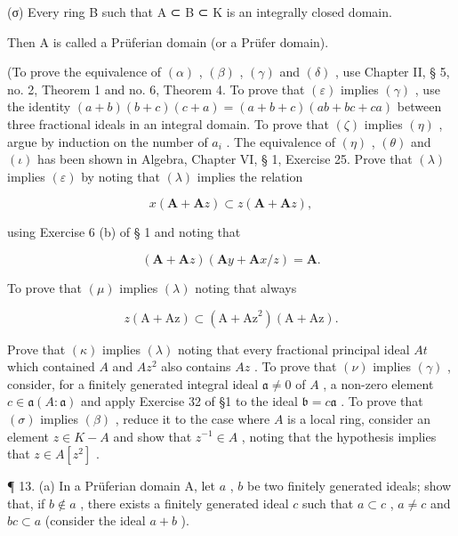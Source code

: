 (σ) Every ring B such that A ⊂ B ⊂ K is an integrally closed domain.

Then A is called a Prüferian domain (or a Prüfer domain).

(To prove the equivalence of \((\alpha)\) , \((\beta)\) , \((\gamma)\) and \((\delta)\) , use Chapter II, § 5, no. 2, Theorem 1 and no. 6, Theorem 4. To prove that \((\varepsilon)\) implies \((\gamma)\) , use the identity \((a + b)(b + c)(c + a) = (a + b + c)(ab + bc + ca)\) between three fractional ideals in an integral domain. To prove that \((\zeta)\) implies \((\eta)\) , argue by induction on the number of \(a_i\) . The equivalence of \((\eta)\) , \((\theta)\) and \((\iota)\) has been shown in Algebra, Chapter VI, § 1, Exercise 25. Prove that \((\lambda)\) implies \((\varepsilon)\) by noting that \((\lambda)\) implies the relation

\[
x (\mathbf {A} + \mathbf {A} z) \subset z (\mathbf {A} + \mathbf {A} z),
\]

using Exercise 6 (b) of § 1 and noting that

\[
(\mathbf {A} + \mathbf {A} z) (\mathbf {A} y + \mathbf {A} x / z) = \mathbf {A}.
\]

To prove that \((\mu)\) implies \((\lambda)\) noting that always

\[
z (\mathrm{A} + \mathrm{Az}) \subset (\mathrm{A} + \mathrm{Az} ^ {2}) (\mathrm{A} + \mathrm{Az}).
\]

Prove that \((\kappa)\) implies \((\lambda)\) noting that every fractional principal ideal \(A t\) which contained \(A\) and \(A z^2\) also contains \(A z\) . To prove that \((\nu)\) implies \((\gamma)\) , consider, for a finitely generated integral ideal \(\mathfrak{a} \neq 0\) of \(A\) , a non-zero element \(c \in \mathfrak{a}(A: \mathfrak{a})\) and apply Exercise 32 of §1 to the ideal \(\mathfrak{b} = c \mathfrak{a}\) . To prove that \((\sigma)\) implies \((\beta)\) , reduce it to the case where \(A\) is a local ring, consider an element \(z \in K - A\) and show that \(z^{-1} \in A\) , noting that the hypothesis implies that \(z \in A[z^2]\) .

¶ 13. (a) In a Prüferian domain A, let \(a\) , \(b\) be two finitely generated ideals; show that, if \(b \notin a\) , there exists a finitely generated ideal \(c\) such that \(a \subset c\) , \(a \neq c\) and \(bc \subset a\) (consider the ideal \(a + b\) ).

